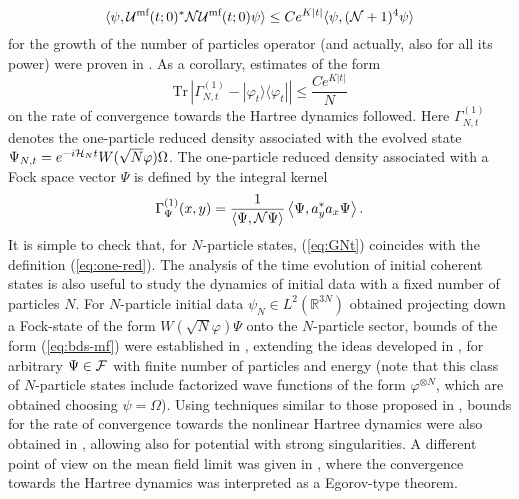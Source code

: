 \documentclass[11pt,a4paper]{article}
\newcommand{\cU}{{\cal U}}
\newcommand{\bR}{{\mathbb R}}
\newcommand{\tr}{\mbox{Tr}}
\newcommand{\cF}{{\cal F}}
\newcommand{\cH}{{\cal H}}
\newcommand{\cN}{{\cal N}}
\begin{document}
\[ \langle \psi , \cU^{\text{mf}} (t;0)^* \cN \cU^{\text{mf}} (t;0) \psi \rangle \leq C e^{K |t|} \langle \psi, (\cN+1)^{4} \psi \rangle \]
for the growth of the number of particles operator (and actually, also for all its power) were proven in \cite{RS}. As a corollary, estimates of the form
\begin{equation}\label{eq:bds-mf} \tr \, \left| \Gamma_{N,t}^{(1)} - |\varphi_t \rangle \langle \varphi_t| \right| \leq \frac{C e^{K|t|}}{N} \end{equation}
on the rate of convergence towards the Hartree dynamics followed. Here $\Gamma_{N,t}^{(1)}$ denotes the one-particle reduced density associated with the evolved state $\Psi_{N,t} = e^{-i\cH_N t} W(\sqrt{N} \varphi) \Omega$. The one-particle reduced density associated with a Fock space vector $\Psi$ is defined by the integral kernel
\begin{equation}\label{eq:GNt} \Gamma_{\Psi}^{(1)} (x,y) = \frac{1}{\langle
\Psi , \cN \Psi \rangle} \left\langle \Psi , a_y^* a_x \Psi \right\rangle. \end{equation}
It is simple to check that, for $N$-particle states, (\ref{eq:GNt}) coincides with the definition (\ref{eq:one-red}). 
The analysis of the time evolution of initial coherent states is also useful to study the dynamics of initial data with a fixed number of particles $N$. For $N$-particle initial data $\psi_N \in L^2 (\bR^{3N})$ obtained projecting down a Fock-state of the form $W(\sqrt{N} \varphi) \Psi$ onto the $N$-particle sector, bounds of the form (\ref{eq:bds-mf}) were established in \cite{CLS}, extending the ideas developed in \cite{RS}, for arbitrary $\Psi \in \cF$ with finite number of particles and energy (note that this class of $N$-particle states include factorized wave functions of the form $\varphi^{\otimes N}$, which are obtained choosing $\psi = \Omega$). Using techniques similar to those proposed in \cite{P}, bounds for the rate of convergence towards the nonlinear Hartree dynamics were also obtained in \cite{KP2009}, allowing also for potential with strong singularities. A different point of view on the mean field limit was given in \cite{FKS}, where the convergence towards the Hartree dynamics was interpreted as a Egorov-type theorem.

\bigskip
\end{document}
